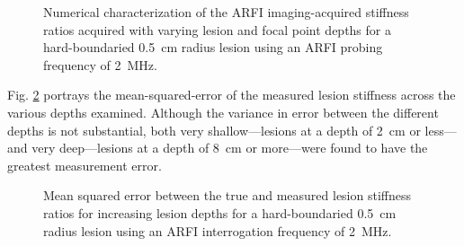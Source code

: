 			\begin{figure}[!htb]
				\centering
				\caption[Numerical characterization of ARFI imaging-acquired stiffness ratio with changing lesion depth]{Numerical characterization of the ARFI imaging-acquired stiffness ratios acquired with varying lesion and focal point depths for a hard-boundaried \SI{0.5}{cm} radius lesion using an ARFI probing frequency of \SI{2}{\MHz}.}
				\label{fig:arfi_depth}
			\end{figure}

			Fig. \ref{fig:arfi_depth_mse} portrays the mean-squared-error of the measured lesion stiffness across the various depths examined. Although the variance in error between the different depths is not substantial, both very shallow---lesions at a depth of \SI{2}{\cm} or less---and very deep---lesions at a depth of \SI{8}{\cm} or more---were found to have the greatest measurement error. 

			\begin{figure}[!htb]
				\centering
				\caption[ARFI imaging-acquired lesion stiffness mean squared error related to lesion depth]{Mean squared error between the true and measured lesion stiffness ratios for increasing lesion depths for a hard-boundaried \SI{0.5}{cm} radius lesion using an ARFI interrogation frequency of \SI{2}{\MHz}.}
				\label{fig:arfi_depth_mse}
			\end{figure}

